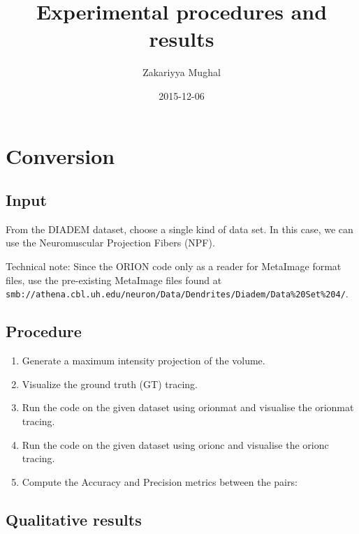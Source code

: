 \documentclass[12pt]{article}
\title{Experimental procedures and results}
\author{Zakariyya Mughal}
\date{2015-12-06}
\begin{document}
\singlespacing

\maketitle
\tableofcontents

\section{Conversion}

\subsection{Input}

From the DIADEM dataset, choose a single kind of data set. In this case, we can
use the Neuromuscular Projection Fibers (NPF).

Technical note: Since the ORION code only as a reader for MetaImage format
files, use the pre-existing MetaImage files found at
\nolinkurl{smb://athena.cbl.uh.edu/neuron/Data/Dendrites/Diadem/Data\%20Set\%204/}.

\subsection{Procedure}

\begin{enumerate}
	\item Generate a maximum intensity projection of the
		volume.
	\item Visualize the ground truth (GT) tracing.
	\item Run the code on the given dataset using
		\gls{orionmat}
		and visualise the \gls{orionmat} tracing.
	\item Run the code on the given dataset using
		\gls{orionc}
		and visualise the \gls{orionc} tracing.
	\item Compute the Accuracy and Precision metrics between the pairs:
\end{enumerate}

\subsection{Qualitative results}
\end{document}
